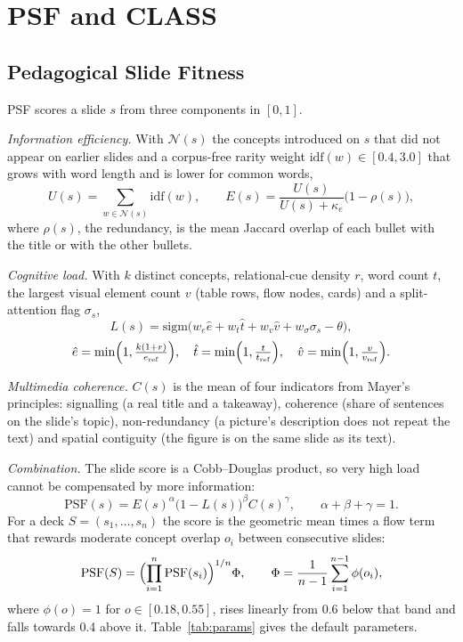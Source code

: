 \documentclass[conference]{IEEEtran}
\begin{document}
\section{PSF and CLASS}
\label{sec:psf}
\subsection{Pedagogical Slide Fitness}
PSF scores a slide $s$ from three components in $[0,1]$.

\textit{Information efficiency.} With $\mathcal{N}(s)$ the concepts introduced on $s$ that did not appear on earlier slides
and a corpus-free rarity weight $\mathrm{idf}(w)\in[0.4,3.0]$ that grows with word length and is lower for common words,
\begin{equation}
U(s)=\sum_{w\in\mathcal{N}(s)}\mathrm{idf}(w),\qquad
E(s)=\frac{U(s)}{U(s)+\kappa_e}\bigl(1-\rho(s)\bigr),
\end{equation}
where $\rho(s)$, the redundancy, is the mean Jaccard overlap of each bullet with the title or with the other bullets.

\textit{Cognitive load.} With $k$ distinct concepts, relational-cue density $r$, word count $t$, the largest visual element
count $v$ (table rows, flow nodes, cards) and a split-attention flag $\sigma_s$,
\begin{equation}
L(s)=\mathrm{sigm}\bigl(w_e\hat e+w_t\hat t+w_v\hat v+w_\sigma\sigma_s-\theta\bigr),
\end{equation}
\begin{equation}
\hat e=\min\Bigl(1,\tfrac{k(1+r)}{e_{\mathrm{ref}}}\Bigr),\quad
\hat t=\min\Bigl(1,\tfrac{t}{t_{\mathrm{ref}}}\Bigr),\quad
\hat v=\min\Bigl(1,\tfrac{v}{v_{\mathrm{ref}}}\Bigr).
\end{equation}

\textit{Multimedia coherence.} $C(s)$ is the mean of four indicators from Mayer's principles: signalling (a real title and
a takeaway), coherence (share of sentences on the slide's topic), non-redundancy (a picture's description does not repeat
the text) and spatial contiguity (the figure is on the same slide as its text).

\textit{Combination.} The slide score is a Cobb--Douglas product, so very high load cannot be compensated by more
information:
\begin{equation}
\mathrm{PSF}(s)=E(s)^{\alpha}\bigl(1-L(s)\bigr)^{\beta}C(s)^{\gamma},\qquad \alpha+\beta+\gamma=1.
\end{equation}
For a deck $S=(s_1,\dots,s_n)$ the score is the geometric mean times a flow term that rewards moderate concept overlap
$o_i$ between consecutive slides:
\begin{equation}
\mathrm{PSF}(S)=\Bigl(\prod_{i=1}^{n}\mathrm{PSF}(s_i)\Bigr)^{1/n}\Phi,\qquad
\Phi=\frac{1}{n-1}\sum_{i=1}^{n-1}\phi(o_i),
\end{equation}
where $\phi(o)=1$ for $o\in[0.18,0.55]$, rises linearly from 0.6 below that band and falls towards 0.4 above it.
Table~\ref{tab:params} gives the default parameters.
\end{document}
